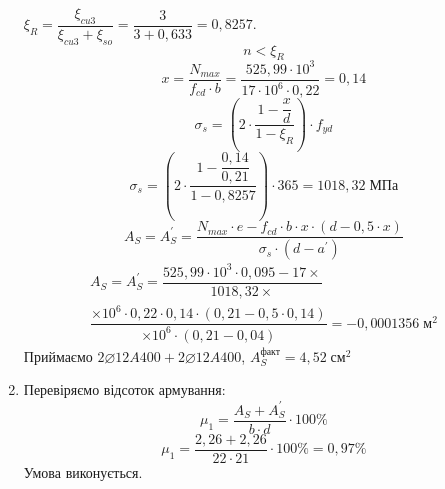 \documentclass[a4paper,14pt]{article}
\begin{document}
\begin{enumerate}
        $\xi_R = \dfrac{\xi_{cu3}}{\xi_{cu3} + \xi_{so}} = \dfrac{3}{3 + 0,633} = 0,8257$.
        $$n < \xi_R$$
        \begin{equation}
            x = \dfrac{N_{max}}{f_{cd} \cdot b} = \dfrac{525,99 \cdot 10^3}{17 \cdot 10^6 \cdot 0,22} = 0,14
        \end{equation}
        \begin{equation}
            \sigma_s = \left(2 \cdot \dfrac{1 - \dfrac{x}{d}}{1 - \xi_R}\right) \cdot f_{yd}
        \end{equation}
        $$\sigma_s = \left(2 \cdot \dfrac{1 - \dfrac{0,14}{0,21}}{1 - 0,8257}\right) \cdot 365 = 1018,32\;\textit{МПа}$$
        \begin{equation}
            A_S = A_S^\prime = \dfrac{N_{max} \cdot e - f_{cd} \cdot b \cdot x \cdot (d - 0,5 \cdot x)}{\sigma_s \cdot (d - a^\prime)}
        \end{equation}
        \begin{multline*}
        A_S = A_S^\prime = \dfrac{525,99 \cdot 10^3 \cdot 0,095 - 17 \times}{1018,32 \times} \\ \dfrac{\times 10^6 \cdot 0,22 \cdot 0,14 \cdot (0,21 - 0,5 \cdot 0,14)}{ \times 10^6 \cdot (0,21 - 0,04)} = -0,0001356\;\textit{м}^2  
    \end{multline*}
        Приймаємо $2\varnothing12A400 + 2\varnothing12A400$, $A_S^{\textit{факт}} = 4,52\;\textit{см}^2$
    \item Перевіряємо відсоток армування:
        \begin{equation}
            \mu_1 = \dfrac{A_S + A_S^\prime}{b \cdot d} \cdot 100\%
        \end{equation}
        $$\mu_1 = \dfrac{2,26 + 2,26}{22 \cdot 21} \cdot 100\% = 0,97\%$$
        Умова виконується.
\end{enumerate}
\newpage
\end{document}
